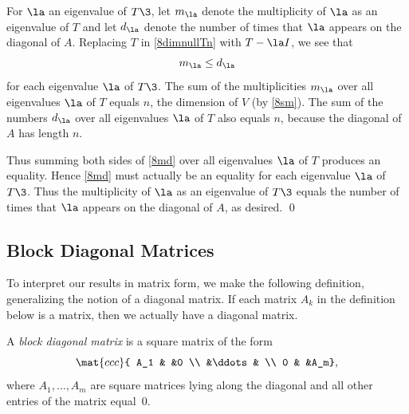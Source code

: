 For $\la$ an eigenvalue of $T\3$, let $m_{\la}$ denote the multiplicity of $\la$ as an eigenvalue of $T$ and let $d_{\la}$ denote the number of times that $\la$ appears on the diagonal of $A$. Replacing $T$ in \ref{8dimnullTn} with $T - \la I$, we see that
\begin{equation} \label{8md}
m_{\la} \le d_{\la}
\end{equation}%
for each eigenvalue $\la$ of $T\3$. The sum of the multiplicities $m_{\la}$ over all eigenvalues $\la$ of $T$ equals $n$, the dimension of $V$ (by \ref{8sm}). The sum of the numbers $d_{\la}$ over all eigenvalues $\la$ of $T$ also equals $n$, because the diagonal of $A$ has length $n$.

Thus summing both sides of \ref{8md} over all eigenvalues $\la$ of $T$ produces an equality. Hence \ref{8md} must actually be an equality for each eigenvalue $\la$ of $T\3$. Thus the multiplicity of $\la$ as an eigenvalue of $T\3$ equals the number of times that $\la$ appears on the diagonal of $A$, as desired.
\qed

\subsection{Block Diagonal Matrices}


To interpret our results in matrix form, we make the following definition, generalizing the notion of a diagonal matrix.
If each matrix $A_k$ in the definition below is a  matrix, then we actually have a diagonal matrix.

{A \emph{block diagonal matrix} is a square
matrix of the form
\[
\mat{ccc}{
A_1 & &0 \\
&\ddots & \\
0 & &A_m},
\]
where $A_1, \dots, A_m$ are square matrices lying along the diagonal and all other entries of the matrix equal~$0$.}

